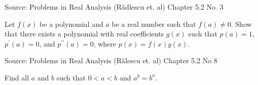 \documentclass[letterpaper,twoside]{book}
\newcounter{ex}
\begin{document}
\begin{que}
Source: Problems in Real Analysis (R\v adlescu et. al) Chapter 5.2 No. 3

Let $f(x)$ be a polynomial and $a$ be a real number such that $f(a)\neq 0$. Show that there exists a polynomial with real coefficients $g(x)$ such that $p(a)=1$, $p^\prime(a)=0$, and $p^{\prime\prime}(a) = 0$, where $p(x)=f(x)g(x)$.  
\end{que}

\begin{que}
Source: Problems in Real Analysis (R\v alescu et. al) Chapter 5.2 No 8

Find all  $a$ and $b$ such that $0<a<b$ and $a^b=b^a$. 
\end{que}	
\end{document}
